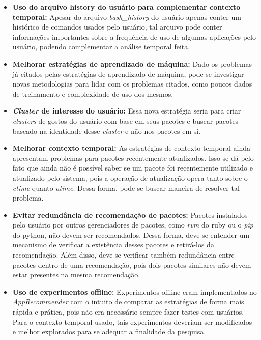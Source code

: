 \begin{itemize}
  \item \textbf{Uso do arquivo history do usuário para complementar contexto
  temporal:} Apesar do arquivo \textit{bash\_history} do usuário apenas conter um
  histórico de comandos usados pelo usuário, tal arquivo pode conter informações
  importantes sobre a frequência de uso de algumas aplicações pelo usuário,
  podendo complementar a análise temporal feita.
  \item \textbf{Melhorar estratégias de aprendizado de máquina:} Dado os
  problemas já citados pelas estratégias de aprendizado de máquina, pode-se
  investigar novas metodologias para lidar com os problemas citados, como poucos
  dados de treinamento e complexidade de uso dos mesmos.
  \item \textbf{\textit{Cluster} de interesse do usuário:} Essa nova estratégia seria
  para criar \textit{clusters} de gostos do usuário com base em seus pacotes e
  buscar pacotes baseado na identidade desse \textit{cluster} e não nos pacotes
  em si.
  \item \textbf{Melhorar contexto temporal:} As estratégias de contexto
  temporal ainda apresentam problemas para pacotes recentemente atualizados.
  Isso se dá pelo fato que ainda não é possível saber se um pacote foi
  recentemente utilizado e atualizado pelo sistema, pois a operação de
  atualização opera tanto sobre o \textit{ctime} quanto \textit{atime}. Dessa
  forma, pode-se buscar maneira de resolver tal problema.
  \item \textbf{Evitar redundância de recomendação de pacotes:} Pacotes
  instalados pelo usuário por outros gerenciadores de pacotes, como
  \textit{rvm} do ruby ou o \textit{pip} do python, não devem ser
  recomendados. Dessa forma, deve-se entender um mecanismo de verificar a
  existência desses pacotes e retirá-los da recomendação. Além disso, deve-se
  verificar também redundância entre pacotes dentro de uma recomendação,
  pois dois pacotes similares não devem estar presentes na mesma
  recomendação.
  \item \textbf{Uso de experimentos offline:} Experimentos offline eram
  implementados no \textit{AppRecommender} com o intuito de comparar as
  estratégias de forma mais rápida e prática, pois não era necessário
  sempre fazer testes com usuários. Para o contexto temporal usado, tais
  experimentos deveriam ser modificados e melhor explorados para se
  adequar a finalidade da pesquisa.
\end{itemize}
